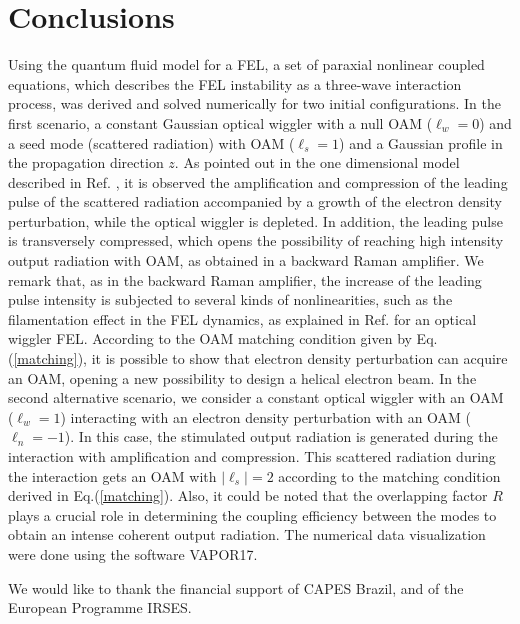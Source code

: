\documentclass[aps,pra,preprint,showpacs,preprintnumbers,amsmath,amssymb]{revtex4-1}
\begin{document}
\section{Conclusions}


Using the quantum fluid model for a FEL, a set of paraxial nonlinear coupled equations, which describes the FEL instability as a three-wave interaction process, was derived and solved numerically for two initial configurations. In the first scenario, a constant Gaussian optical wiggler with a null OAM ($\ell_w = 0$) and a seed mode (scattered radiation) with OAM ($\ell_s = 1$) and a Gaussian profile in the propagation direction $z$. As pointed out in the one dimensional model described in Ref. \cite{guarumo}, it is observed the amplification and compression of the leading pulse of the scattered radiation accompanied by a growth of the electron density perturbation, while the optical wiggler is depleted. In addition, the leading pulse is transversely compressed, which opens the possibility of reaching high intensity output radiation with OAM, as obtained in a backward Raman amplifier\cite{titonature}. We remark that, as in the backward Raman amplifier, the increase of the leading pulse intensity is subjected to several kinds of nonlinearities, such as the filamentation effect in the FEL dynamics, as explained in Ref.\cite{rizzato} for an optical wiggler FEL. According to the OAM  matching condition given by Eq.(\ref{matching}), it is possible to show that electron density perturbation can acquire an OAM, opening a new possibility to design a helical electron beam.
In the second alternative scenario, we consider a constant optical wiggler with an OAM ($\ell_w = 1$) interacting with an electron density perturbation with an OAM ($\ell_n = -1$). In this case, the stimulated output radiation is generated during the interaction with amplification and compression. This scattered radiation during the interaction gets an OAM with $|\ell_s| = 2$ according to the   matching condition derived in Eq.(\ref{matching}). Also, it could be noted that the overlapping factor $R$ plays a crucial role in determining the coupling efficiency between the modes to obtain an intense coherent output radiation.
The numerical data visualization were done using the software VAPOR17\cite{vapor}.

\begin{acknowledgments}
We would like to thank the financial support of CAPES Brazil, and of the European Programme IRSES.
\end{acknowledgments}
\end{document}
